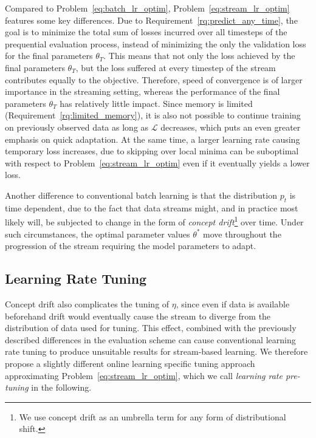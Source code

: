 \documentclass[letterpaper]{article} %
\begin{document}
Compared to Problem~\eqref{eq:batch_lr_optim}, Problem~\eqref{eq:stream_lr_optim} features some key differences.
Due to Requirement~\ref{rq:predict_any_time}, the goal is to minimize the total sum of losses incurred over all timesteps of the prequential evaluation process,  instead of minimizing the only the validation loss for the final parameters $\theta_T$.
This means that not only the loss achieved by the final parameters $\theta_T$, but the loss suffered at every timestep of the stream contributes equally to the objective.
Therefore, speed of convergence is of larger importance in the streaming setting, whereas the performance of the final parameters $\theta_T$ has relatively little impact.
Since memory is limited (Requirement~\ref{rq:limited_memory}), it is also not possible to continue training on previously observed data as long as $\mathcal{L}$ decreases, which puts an even greater emphasis on quick adaptation.
At the same time, a larger learning rate causing temporary loss increases, due to skipping over local minima can be suboptimal with respect to Problem~\eqref{eq:stream_lr_optim} even if it eventually yields a lower loss.

Another difference to conventional batch learning is that the distribution $p_t$ is time dependent, due to the fact that data streams might, and in practice most likely will, be subjected to change in the form of \textit{concept drift}\footnote{We use concept drift as an umbrella term for any form of distributional shift.} over time.
Under such circumstances, the optimal parameter values $\theta^*$ move throughout the progression of the stream requiring the model parameters to adapt.



\subsection{Learning Rate Tuning} \label{subsec:pre-tuning}

Concept drift also complicates the tuning of $\eta$, since even if data is available beforehand drift would eventually cause the stream to diverge from the distribution of data used for tuning.
This effect, combined with the previously described differences in the evaluation scheme can cause conventional learning rate tuning to produce unsuitable results for stream-based learning.
We therefore propose a slightly different online learning specific tuning approach approximating Problem~\eqref{eq:stream_lr_optim}, which we call \textit{learning rate pre-tuning} in the following.
\end{document}
